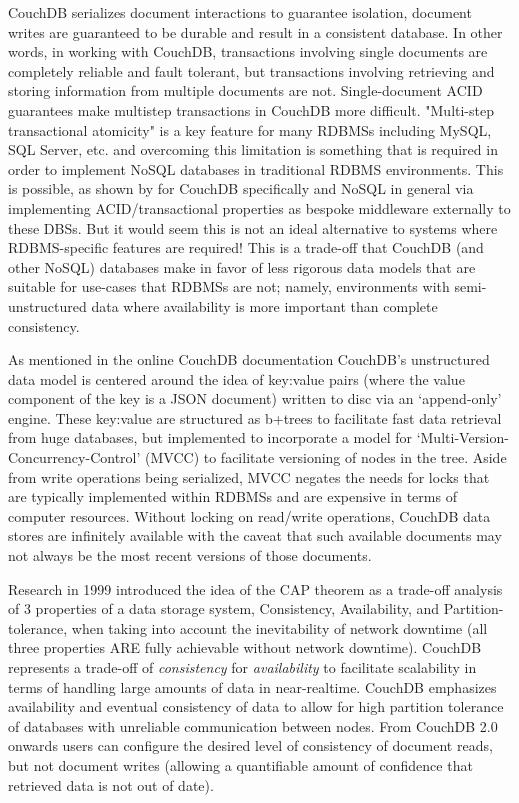CouchDB serializes document interactions to guarantee isolation, document writes are guaranteed to be durable and result in a consistent database. In other words, in working with CouchDB, transactions involving single documents are completely reliable and fault tolerant, but transactions involving retrieving and storing information from multiple documents are not. Single-document ACID guarantees make multistep transactions in CouchDB more difficult. "Multi-step transactional atomicity" is a key feature for many RDBMSs including MySQL, SQL Server, etc. and overcoming this limitation is something that is required in order to implement NoSQL databases in traditional RDBMS environments. This is possible, as shown by \cite{Rashmi2017} for CouchDB specifically and NoSQL in general \cite{LOTFY2016133} via implementing ACID/transactional properties as bespoke middleware externally to these DBSs. But it would seem this is not an ideal alternative to systems where RDBMS-specific features are required! This is a trade-off that CouchDB (and other NoSQL) databases make in favor of less rigorous data models that are suitable for use-cases that RDBMSs are not; namely, environments with semi-unstructured data where availability is more important than complete consistency.

As mentioned in the online CouchDB documentation \cite{couchguide} CouchDB's unstructured data model is centered around the idea of key:value pairs (where the value component of the key is a JSON document) written to disc via an `append-only' engine. These key:value are structured as b+trees to facilitate fast data retrieval from huge databases, but implemented to incorporate a model for `Multi-Version-Concurrency-Control' (MVCC) to facilitate versioning of nodes in the tree. Aside from write operations being serialized, MVCC negates the needs for locks that are typically implemented within RDBMSs and are expensive in terms of computer resources. Without locking on read/write operations, CouchDB data stores are infinitely available with the caveat that such available documents may not always be the most recent versions of those documents.

Research in 1999 \cite{cap} introduced the idea of the CAP theorem as a trade-off analysis of 3 properties of a data storage system, Consistency, Availability, and Partition-tolerance, when taking into account the inevitability of network downtime (all three properties ARE fully achievable without network downtime). CouchDB represents a trade-off of \textit{consistency} for \textit{availability} to facilitate scalability in terms of handling large amounts of data in near-realtime. CouchDB emphasizes availability and eventual consistency of data to allow for high partition tolerance of databases with unreliable communication between nodes. From CouchDB 2.0 onwards users can configure the desired level of consistency of document reads, but not document writes (allowing a quantifiable amount of confidence that retrieved data is not out of date).

